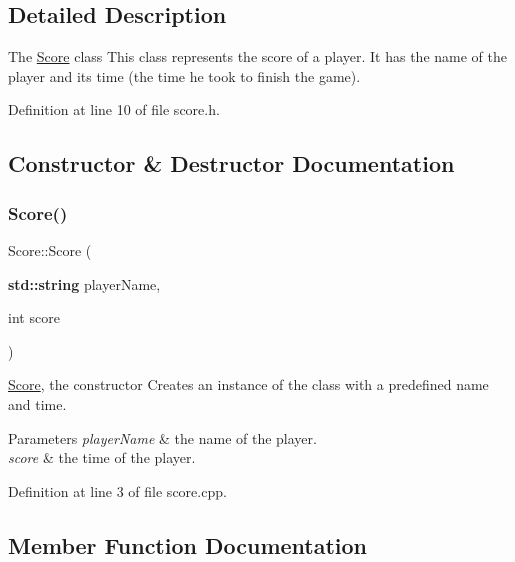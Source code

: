 \subsection{Detailed Description}
The \hyperlink{class_score}{Score} class This class represents the score of a player. It has the name of the player and its time (the time he took to finish the game). 

Definition at line 10 of file score.\+h.



\subsection{Constructor \& Destructor Documentation}
\mbox{\label{class_score_af07252e30895cde501587fd0a692c42a}} 
\subsubsection{\texorpdfstring{Score()}{Score()}}
{\footnotesize\ttfamily Score\+::\+Score (\begin{DoxyParamCaption}\item[{\textbf{ std\+::string}}]{player\+Name,  }\item[{int}]{score }\end{DoxyParamCaption})}



\hyperlink{class_score}{Score}, the constructor Creates an instance of the class with a predefined name and time. 


\begin{DoxyParams}{Parameters}
{\em player\+Name} & the name of the player. \\
\hline
{\em score} & the time of the player. \\
\hline
\end{DoxyParams}


Definition at line 3 of file score.\+cpp.



\subsection{Member Function Documentation}
\mbox{\label{class_score_ad254f42b5b7e74269836d801220d1a7a}} 
